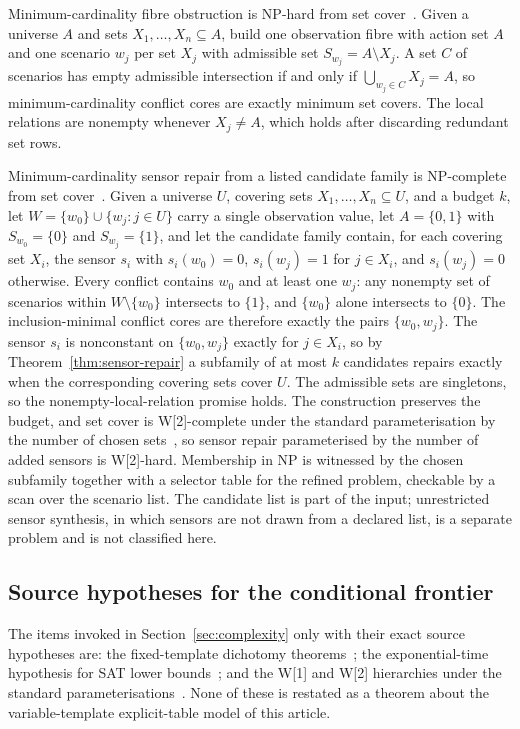 \documentclass[11pt]{article}
\theoremstyle{plain}
\theoremstyle{definition}
\theoremstyle{remark}
\begin{document}
Minimum-cardinality fibre obstruction is NP-hard from set
cover~\cite{karp72}.  Given a universe \(A\) and sets \(X_1,\dots,X_n
\subseteq A\), build one observation fibre with action set \(A\) and one
scenario \(w_j\) per set \(X_j\) with admissible set \(S_{w_j}=A\setminus
X_j\).  A set \(C\) of scenarios has empty admissible intersection if and
only if \(\bigcup_{w_j\in C}X_j=A\), so minimum-cardinality conflict cores
are exactly minimum set covers.  The local relations are nonempty whenever
\(X_j\ne A\), which holds after discarding redundant set rows.

Minimum-cardinality sensor repair from a listed candidate family is
NP-complete from set cover~\cite{karp72}.  Given a universe \(U\), covering
sets \(X_1,\dots,X_n\subseteq U\), and a budget \(k\), let
\(W=\{w_0\}\cup\{w_j:j\in U\}\) carry a single observation value, let
\(A=\{0,1\}\) with \(S_{w_0}=\{0\}\) and \(S_{w_j}=\{1\}\), and let the
candidate family contain, for each covering set \(X_i\), the sensor \(s_i\)
with \(s_i(w_0)=0\), \(s_i(w_j)=1\) for \(j\in X_i\), and \(s_i(w_j)=0\)
otherwise.  Every conflict contains \(w_0\) and at least one \(w_j\): any
nonempty set of scenarios within \(W\setminus\{w_0\}\) intersects to
\(\{1\}\), and \(\{w_0\}\) alone intersects to \(\{0\}\).  The
inclusion-minimal conflict cores are therefore exactly the pairs
\(\{w_0,w_j\}\).  The sensor \(s_i\) is nonconstant on \(\{w_0,w_j\}\)
exactly for \(j\in X_i\), so by Theorem~\ref{thm:sensor-repair} a subfamily
of at most \(k\) candidates repairs exactly when the corresponding covering
sets cover \(U\).  The admissible sets are singletons, so the
nonempty-local-relation promise holds.  The construction preserves the
budget, and set cover is W[2]-complete under the standard parameterisation by
the number of chosen sets~\cite{downey-fellows99}, so sensor repair
parameterised by the number of added sensors is W[2]-hard.  Membership in NP
is witnessed by the chosen subfamily together with a selector table for the
refined problem, checkable by a scan over the scenario list.  The candidate
list is part of the input; unrestricted sensor synthesis, in which sensors
are not drawn from a declared list, is a separate problem and is not
classified here.

\subsection{Source hypotheses for the conditional frontier}

The items invoked in Section~\ref{sec:complexity} only with their exact
source hypotheses are: the fixed-template dichotomy
theorems~\cite{schaefer78,zhuk17}; the exponential-time hypothesis for SAT
lower bounds~\cite{impagliazzo-paturi01}; and the W[1] and W[2] hierarchies
under the standard parameterisations~\cite{downey-fellows99}.  None of these
is restated as a theorem about the variable-template explicit-table model of
this article.
\end{document}
